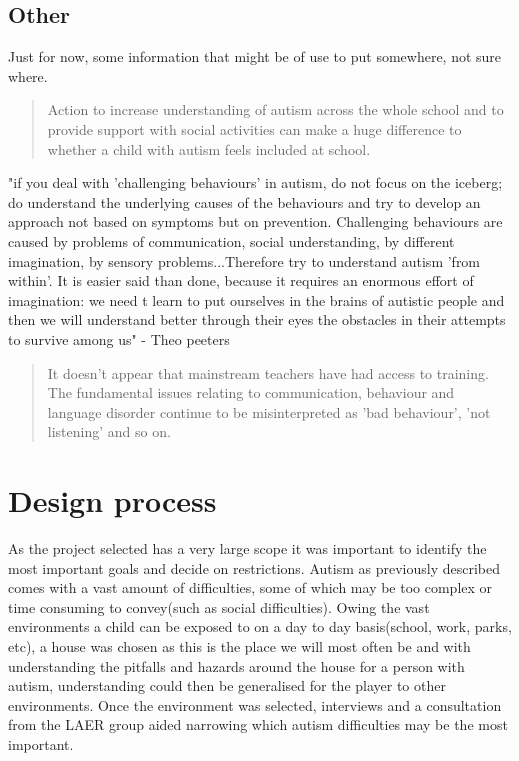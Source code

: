 \documentclass[11pt]{report}
\begin{document}
\section{Other}
Just for now, some information that might be of use to put somewhere, not sure where.

\begin{quote}
Action to increase understanding of autism across the whole school and to provide support with social activities can make a huge difference to whether a child with autism feels included at school.\cite{nasschool}
\end{quote}

"if you deal with 'challenging behaviours' in autism, do not focus on the iceberg; do understand the underlying causes of the behaviours and try to develop an approach not based on symptoms but on prevention. Challenging behaviours are caused by problems of communication, social understanding, by different imagination, by sensory problems...Therefore try to understand autism 'from within'. It is easier said than done, because it requires an enormous effort of imagination: we need t learn to put ourselves in the brains of autistic people and then we will understand better through their eyes the obstacles in their attempts to survive among us" - Theo peeters \cite{olgab}

\begin{quote}
It doesn't appear that mainstream teachers have had access to training. The fundamental issues relating to communication, behaviour and language disorder continue to be misinterpreted as 'bad behaviour', 'not listening' and so on.\cite{nasschool}
\end{quote}



\chapter{Design process}
As the project selected has a very large scope it was important to identify the most important goals and decide on restrictions. Autism as previously described comes with a vast amount of difficulties, some of which may be too complex or time consuming to convey(such as social difficulties). Owing the vast environments a child can be exposed to on a day to day basis(school, work, parks, etc), a house was chosen as this is the place we will most often be and with understanding the pitfalls and hazards around the house for a person with autism, understanding could then be generalised for the player to other environments. Once the environment was selected, interviews and a consultation from the LAER group aided narrowing which autism difficulties may be the most important.
\end{document}
